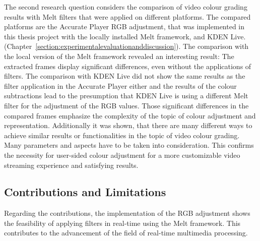 \documentclass[../MasterThesis.tex]{subfiles}
\begin{document}
The second research question considers the comparison of video colour grading results with Melt filters that were applied on different platforms. The compared platforms are the Accurate Player RGB adjustment, that was implemented in this thesis project with the locally installed Melt framework, and KDEN Live. (Chapter~\ref{section:experimentalevaluationanddiscussion}).
%
%
The comparison with the local version of the Melt framework revealed an interesting result: The extracted frames display significant differences, even without the applications of filters. 
The comparison with KDEN Live did not show the same results as the filter application in the Accurate Player either and the results of the colour subtractions lead to the presumption that KDEN Live is using a different Melt filter for the adjustment of the RGB values.
%
Those significant differences in the compared frames emphasize the complexity of the topic of colour adjustment and representation. 
%
%
Additionally it was shown, that there are many different ways to achieve similar results or functionalities in the topic of video colour grading. Many parameters and aspects have to be taken into consideration. This confirms the necessity for user-sided colour adjustment for a more customizable video streaming experience and satisfying results. 





\subsection{Contributions and Limitations} \label{subsection:contributionslimitations}



Regarding the contributions, the implementation of the RGB adjustment shows the feasibility of applying filters in real-time using the Melt framework.
This contributes to the advancement of the field of real-time multimedia processing.
\end{document}
